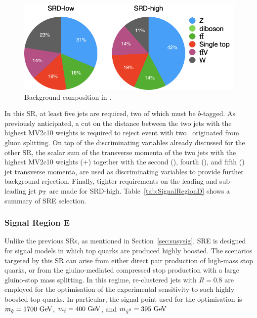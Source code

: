 				\begin{figure}[t]
				  \begin{center}
				   \includegraphics[width=.7\textwidth]{figures/stop/piechart_SRDcomp}
				   \caption{Background composition in \SRD.}
				   \label{fig:SRD_bkgcomp}
				  \end{center}
				\end{figure}

				In this \ac{SR}, at least five jets are required, two of which must be $b$-tagged. As previously anticipated, a cut on the distance between the two jets with the highest MV2c10 weights is required to reject event with two \bjs\ originated from gluon splitting. On top of the discriminating variables already discussed for the other \ac{SR}, the scalar sum of the transverse momenta of the two jets with the highest MV2c10 weights (\ptbzero+\ptbone) together with the second (\ptone), fourth (\ptthree), and fifth (\ptfour) jet transverse momenta, are used as discriminating variables to provide further background rejection. Finally, tighter requirements on the leading and sub-leading jet $p_{\mathrm{T}}$ are made for SRD-high. Table~\ref{tab:SignalRegionD} shows a summary of SRE selection.






			\subsubsection*{Signal Region E}


				Unlike the previous \acp{SR}, as mentioned in Section~\ref{sec:susysig}, SRE is designed for signal models in which top quarks are produced highly boosted. The scenarios targeted by this \ac{SR} can arise from either direct pair production of high-mass stop quarks, or from the gluino-mediated compressed stop production with a large gluino-stop mass splitting. In this regime, re-clustered jets with $R=0.8$ are employed for the optimisation of the experimental sensitivity to such highly boosted top quarks. In particular, the signal point used for the optimisation is $m_{\gluino} = 1700 \GeV$, $\mstop=400\GeV$, and $\mLSP=395\GeV$

